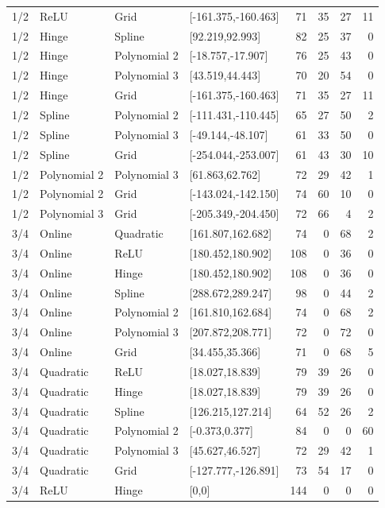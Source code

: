 \begin{longtable}{llllrrrr}
1/2 & ReLU & Grid & [-161.375,-160.463] & 71 & 35 & 27 & 11 \\
1/2 & Hinge & Spline & [92.219,92.993] & 82 & 25 & 37 & 0 \\
1/2 & Hinge & Polynomial 2 & [-18.757,-17.907] & 76 & 25 & 43 & 0 \\
1/2 & Hinge & Polynomial 3 & [43.519,44.443] & 70 & 20 & 54 & 0 \\
1/2 & Hinge & Grid & [-161.375,-160.463] & 71 & 35 & 27 & 11 \\
1/2 & Spline & Polynomial 2 & [-111.431,-110.445] & 65 & 27 & 50 & 2 \\
1/2 & Spline & Polynomial 3 & [-49.144,-48.107] & 61 & 33 & 50 & 0 \\
1/2 & Spline & Grid & [-254.044,-253.007] & 61 & 43 & 30 & 10 \\
1/2 & Polynomial 2 & Polynomial 3 & [61.863,62.762] & 72 & 29 & 42 & 1 \\
1/2 & Polynomial 2 & Grid & [-143.024,-142.150] & 74 & 60 & 10 & 0 \\
1/2 & Polynomial 3 & Grid & [-205.349,-204.450] & 72 & 66 & 4 & 2 \\
3/4 & Online & Quadratic & [161.807,162.682] & 74 & 0 & 68 & 2 \\
3/4 & Online & ReLU & [180.452,180.902] & 108 & 0 & 36 & 0 \\
3/4 & Online & Hinge & [180.452,180.902] & 108 & 0 & 36 & 0 \\
3/4 & Online & Spline & [288.672,289.247] & 98 & 0 & 44 & 2 \\
3/4 & Online & Polynomial 2 & [161.810,162.684] & 74 & 0 & 68 & 2 \\
3/4 & Online & Polynomial 3 & [207.872,208.771] & 72 & 0 & 72 & 0 \\
3/4 & Online & Grid & [34.455,35.366] & 71 & 0 & 68 & 5 \\
3/4 & Quadratic & ReLU & [18.027,18.839] & 79 & 39 & 26 & 0 \\
3/4 & Quadratic & Hinge & [18.027,18.839] & 79 & 39 & 26 & 0 \\
3/4 & Quadratic & Spline & [126.215,127.214] & 64 & 52 & 26 & 2 \\
3/4 & Quadratic & Polynomial 2 & [-0.373,0.377] & 84 & 0 & 0 & 60 \\
3/4 & Quadratic & Polynomial 3 & [45.627,46.527] & 72 & 29 & 42 & 1 \\
3/4 & Quadratic & Grid & [-127.777,-126.891] & 73 & 54 & 17 & 0 \\
3/4 & ReLU & Hinge & [0,0] & 144 & 0 & 0 & 0 \\

\end{longtable}
